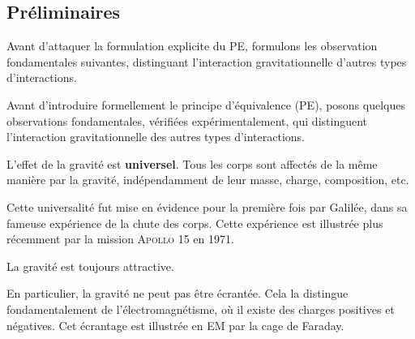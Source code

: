 \subsection{Préliminaires}
\label{sec:PE1}
Avant d'attaquer la formulation explicite du PE, formulons les observation fondamentales suivantes, distinguant l'interaction gravitationnelle d'autres types d'interactions.

Avant d'introduire formellement le principe d'équivalence (PE), posons quelques observations fondamentales, vérifiées expérimentalement, qui distinguent l'interaction gravitationnelle des autres types d'interactions.
\begin{theoremframe}
    \begin{propri}
        \label{post:PE1}
        L'effet de la gravité est \textbf{universel}. Tous les corps sont affectés de la même manière par la gravité, indépendamment de leur masse, charge, composition, etc.
    \end{propri}
\end{theoremframe}
Cette universalité fut mise en évidence pour la première fois par Galilée, dans sa fameuse expérience de la chute des corps. Cette expérience est illustrée plus récemment par la mission \textsc{Apollo 15} en 1971.
\begin{theoremframe}
    \begin{propri}
        \label{post:PE2}
        La gravité est toujours attractive.
    \end{propri}
\end{theoremframe}
En particulier, la gravité ne peut pas être écrantée. Cela la distingue fondamentalement de l'électromagnétisme, où il existe des charges positives et négatives. Cet écrantage est illustrée en EM par la cage de Faraday.


